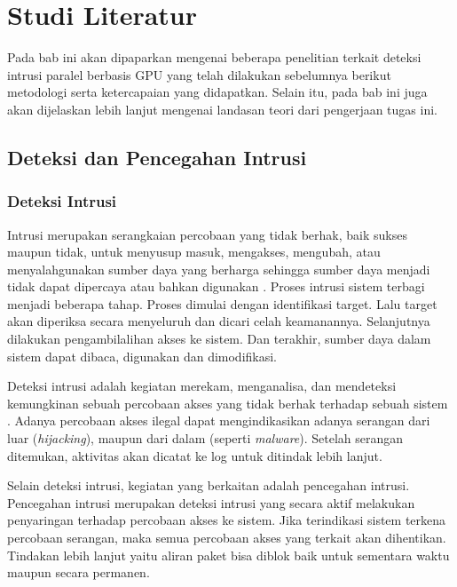 
\chapter{Studi Literatur}

  Pada bab ini akan dipaparkan mengenai beberapa penelitian terkait deteksi intrusi paralel berbasis GPU yang telah dilakukan sebelumnya berikut metodologi serta ketercapaian yang didapatkan. Selain itu, pada bab ini juga akan dijelaskan lebih lanjut mengenai landasan teori dari pengerjaan tugas ini.


\section{Deteksi dan Pencegahan Intrusi}

  \subsection{Deteksi Intrusi}

    Intrusi merupakan serangkaian percobaan yang tidak berhak, baik sukses maupun tidak, untuk menyusup masuk, mengakses, mengubah, atau menyalahgunakan sumber daya yang berharga sehingga sumber daya menjadi tidak dapat dipercaya atau bahkan digunakan \citep{kizza2015}. Proses intrusi sistem terbagi menjadi beberapa tahap. Proses dimulai dengan identifikasi target. Lalu target akan diperiksa secara menyeluruh dan dicari celah keamanannya. Selanjutnya dilakukan pengambilalihan akses ke sistem. Dan terakhir, sumber daya dalam sistem dapat dibaca, digunakan dan dimodifikasi. 

    Deteksi intrusi adalah kegiatan merekam, menganalisa, dan mendeteksi kemungkinan sebuah percobaan akses yang tidak berhak terhadap sebuah sistem \citep{kizza2015}. Adanya percobaan akses ilegal dapat mengindikasikan adanya serangan dari luar (\emph{hijacking}), maupun dari dalam (seperti \emph{malware}). Setelah serangan ditemukan, aktivitas akan dicatat ke log untuk ditindak lebih lanjut.

    Selain deteksi intrusi, kegiatan yang berkaitan adalah pencegahan intrusi. Pencegahan intrusi merupakan deteksi intrusi yang secara aktif melakukan penyaringan terhadap percobaan akses ke sistem. Jika terindikasi sistem terkena percobaan serangan, maka semua percobaan akses yang terkait akan dihentikan. Tindakan lebih lanjut yaitu aliran paket bisa diblok baik untuk sementara waktu maupun secara permanen.

